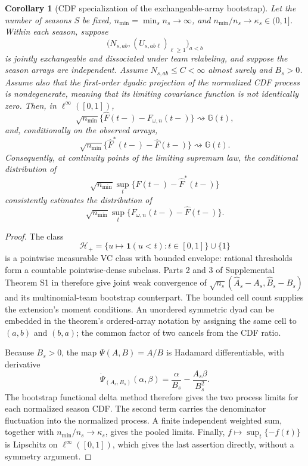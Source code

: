 \documentclass[12pt,letterpaper]{article}
\theoremstyle{plain}
\newtheorem{corollary}[theorem]{Corollary}
\begin{document}
\begin{corollary}[CDF specialization of the exchangeable-array bootstrap] \label{cor:dyadic-cdf}
Let the number of seasons $S$ be fixed, $n_{\min}=\min_s n_s\to\infty$, and $n_{\min}/n_s\to\kappa_s\in(0,1]$.
Within each season, suppose
\[
\bigl(N_{s,ab},(U_{s,ab\ell})_{\ell\ge1}\bigr)_{a<b}
\]
is jointly exchangeable and dissociated under team relabeling, and suppose the season arrays are independent.
Assume $N_{s,ab}\le C<\infty$ almost surely and $B_s>0$.
Assume also that the first-order dyadic projection of the normalized CDF process is nondegenerate, meaning that its limiting covariance function is not identically zero.
Then, in $\ell^\infty([0,1])$,
\[
\sqrt{n_{\min}}\{\widehat F(t-)-F_{\omega,n}(t-)\}
\rightsquigarrow \mathbb G(t),
\]
and, conditionally on the observed arrays,
\[
\sqrt{n_{\min}}\{\widehat F^*(t-)-\widehat F(t-)\}
\rightsquigarrow \mathbb G(t).
\]
Consequently, at continuity points of the limiting supremum law, the conditional distribution of
\[
\sqrt{n_{\min}}\sup_t\{\widehat F(t-)-\widehat F^*(t-)\}
\]
consistently estimates the distribution of
\[
\sqrt{n_{\min}}\sup_t\{F_{\omega,n}(t-)-\widehat F(t-)\}.
\]
\end{corollary}

\begin{proof}
The class
\[
\mathcal H_+=\{u\mapsto\mathbf 1(u<t):t\in[0,1]\}\cup\{1\}
\]
is a pointwise measurable VC class with bounded envelope: rational thresholds form a countable pointwise-dense subclass.
Parts 2 and 3 of Supplemental Theorem S1 in \citet{DaveziesDHAultfoeuilleGuyonvarch2021} therefore give joint weak convergence of
$\sqrt{n_s}(\widehat A_s-A_s,\widehat B_s-B_s)$ and its multinomial-team bootstrap counterpart.
The bounded cell count supplies the extension's moment conditions.
An unordered symmetric dyad can be embedded in the theorem's ordered-array notation by assigning the same cell to $(a,b)$ and $(b,a)$; the common factor of two cancels from the CDF ratio.

Because $B_s>0$, the map $\Psi(A,B)=A/B$ is Hadamard differentiable, with derivative
\[
\dot\Psi_{(A_s,B_s)}(\alpha,\beta)
=\frac{\alpha}{B_s}-\frac{A_s\beta}{B_s^2}.
\]
The bootstrap functional delta method therefore gives the two process limits for each normalized season CDF.
The second term carries the denominator fluctuation into the normalized process.
A finite independent weighted sum, together with $n_{\min}/n_s\to\kappa_s$, gives the pooled limits.
Finally, $f\mapsto\sup_t\{-f(t)\}$ is Lipschitz on $\ell^\infty([0,1])$, which gives the last assertion directly, without a symmetry argument.
\end{proof}
\end{document}
